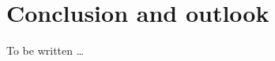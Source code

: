 \documentclass[amt, manuscript]{copernicus}
\begin{document}
\section{Conclusion and outlook}  %
%
To be written \dots















\appendix
\section{}    %

\subsection{}     %


\noappendix       %



\end{document}
